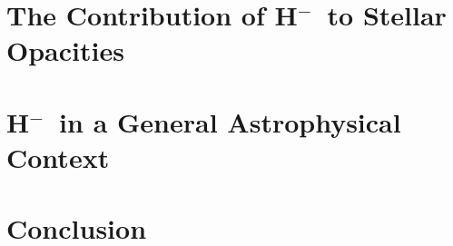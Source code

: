 \documentclass{emulateapj}
\def\h{H$^-$}
\begin{document}
\section{The Contribution of \h\ to Stellar Opacities}



\section{\h\ in a General Astrophysical Context}


\section{Conclusion}





\end{document}
